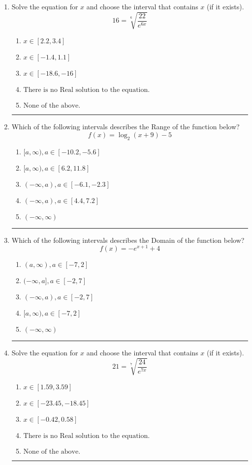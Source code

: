 \documentclass[14pt]{extbook}
\newcommand{\litem}[1]{\item#1\hspace*{-1cm}\rule{\textwidth}{0.4pt}}
\begin{document}
\begin{enumerate}
\litem{
 Solve the equation for $x$ and choose the interval that contains $x$ (if it exists).\[  16 = \sqrt[6]{\frac{22}{e^{6x}}} \]\begin{enumerate}[label=\Alph*.]
\item \( x \in [2.2, 3.4] \)
\item \( x \in [-1.4, 1.1] \)
\item \( x \in [-18.6, -16] \)
\item \( \text{There is no Real solution to the equation.} \)
\item \( \text{None of the above.} \)

\end{enumerate} }
\litem{
Which of the following intervals describes the Range of the function below?\[ f(x) = \log_2{(x+9)}-5 \]\begin{enumerate}[label=\Alph*.]
\item \( [a, \infty), a \in [-10.2, -5.6] \)
\item \( [a, \infty), a \in [6.2, 11.8] \)
\item \( (-\infty, a), a \in [-6.1, -2.3] \)
\item \( (-\infty, a), a \in [4.4, 7.2] \)
\item \( (-\infty, \infty) \)

\end{enumerate} }
\litem{
Which of the following intervals describes the Domain of the function below?\[ f(x) = -e^{x+1}+4 \]\begin{enumerate}[label=\Alph*.]
\item \( (a, \infty), a \in [-7, 2] \)
\item \( (-\infty, a], a \in [-2, 7] \)
\item \( (-\infty, a), a \in [-2, 7] \)
\item \( [a, \infty), a \in [-7, 2] \)
\item \( (-\infty, \infty) \)

\end{enumerate} }
\litem{
 Solve the equation for $x$ and choose the interval that contains $x$ (if it exists).\[  21 = \sqrt[7]{\frac{24}{e^{7x}}} \]\begin{enumerate}[label=\Alph*.]
\item \( x \in [1.59, 3.59] \)
\item \( x \in [-23.45, -18.45] \)
\item \( x \in [-0.42, 0.58] \)
\item \( \text{There is no Real solution to the equation.} \)
\item \( \text{None of the above.} \)


\end{enumerate}}
\end{enumerate}
\end{document}
